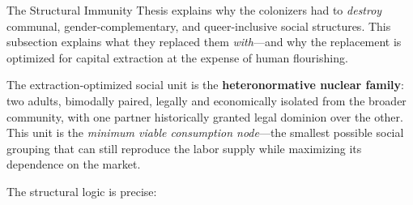 The Structural Immunity Thesis explains why the colonizers had to \textit{destroy} communal, gender-complementary, and queer-inclusive social structures. This subsection explains what they replaced them \textit{with}---and why the replacement is optimized for capital extraction at the expense of human flourishing.

The extraction-optimized social unit is the \textbf{heteronormative nuclear family}: two adults, bimodally paired, legally and economically isolated from the broader community, with one partner historically granted legal dominion over the other. This unit is the \textit{minimum viable consumption node}---the smallest possible social grouping that can still reproduce the labor supply while maximizing its dependence on the market.

The structural logic is precise:

